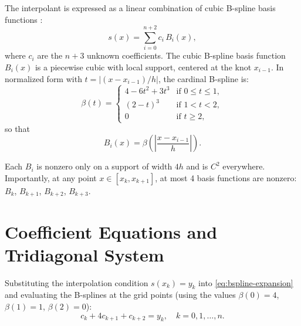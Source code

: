 \documentclass[11pt,a4paper]{article}
\begin{document}
The interpolant is expressed as a linear combination of cubic B-spline
basis functions \cite{deBoor1978}:
\begin{equation}\label{eq:bspline-expansion}
  s(x) = \sum_{i=0}^{n+2} c_i \, B_i(x),
\end{equation}
where $c_i$ are the $n + 3$ unknown coefficients. The cubic B-spline basis
function $B_i(x)$ is a piecewise cubic with local support, centered at the
knot $x_{i-1}$. In normalized form with $t = |(x - x_{i-1}) / h|$, the
cardinal B-spline is:
\begin{equation}\label{eq:beta}
  \beta(t) = \begin{cases}
    4 - 6t^2 + 3t^3 & \text{if } 0 \le t \le 1, \\
    (2 - t)^3        & \text{if } 1 < t < 2, \\
    0                & \text{if } t \ge 2,
  \end{cases}
\end{equation}
so that
\begin{equation}\label{eq:Bi}
  B_i(x) = \beta\!\left(\left|\frac{x - x_{i-1}}{h}\right|\right).
\end{equation}

Each $B_i$ is nonzero only on a support of width $4h$ and is $C^2$
everywhere. Importantly, at any point $x \in [x_k, x_{k+1}]$, at most
4 basis functions are nonzero: $B_k$, $B_{k+1}$, $B_{k+2}$, $B_{k+3}$.

\section{Coefficient Equations and Tridiagonal System}

Substituting the interpolation condition $s(x_k) = y_k$ into
\eqref{eq:bspline-expansion} and evaluating the B-splines at the grid
points (using the values $\beta(0) = 4$, $\beta(1) = 1$, $\beta(2) = 0$):
\begin{equation}\label{eq:interp-cond}
  c_{k} + 4 c_{k+1} + c_{k+2} = y_k, \quad k = 0, 1, \ldots, n.
\end{equation}
\end{document}
